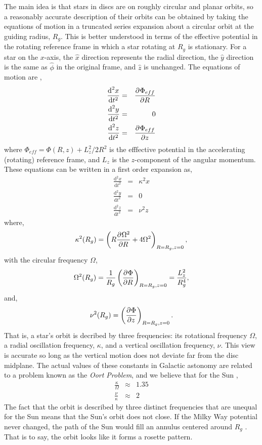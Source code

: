 The main idea is that stars in discs are on roughly circular and planar orbits, so a reasonably accurate description of their orbits can be obtained by taking the equations of motion in a truncated series expansion about a circular orbit at the guiding radius, $R_g$. This is better understood in terms of the effective potential in the rotating reference frame in which a star rotating at $R_g$ is stationary. For a star on the $x$-axis, the $\hat{x}$ direction represents the radial direction, the $\hat{y}$ direction is the same as $\hat{\phi}$ in the original frame, and $\hat{z}$ is unchanged. The equations of motion are \citep{BT},
\begin{eqnarray}
\frac{\text{d}^2x}{\text{d} t^2} &=& \frac{\partial^{} {\Phi_{eff}}}{\partial {R}^{}}\\
\frac{\text{d}^2y}{\text{d} t^2} &=& 0\\
\frac{\text{d}^2z}{\text{d} t^2} &=& \frac{\partial^{} {\Phi_{eff}}}{\partial {z}^{}}
\end{eqnarray}
where $\Phi_{eff} = \Phi(R,z) + L_z^2/2 R^2$ is the efffective potential in the accelerating (rotating) reference frame, and $L_z$ is the $z$-component of the angular momentum. These equations can be written in a first order expansion as,
\begin{eqnarray}
\frac{\text{d}^2x}{\text{d} t^2} &=& \kappa^2 x\\
\frac{\text{d}^2y}{\text{d} t^2} &=& 0\\
\frac{\text{d}^2z}{\text{d} t^2} &=& \nu^2 z
\end{eqnarray}
where,
\begin{equation}
\kappa^2(R_g) = \left(R \frac{\partial^{} {\Omega^2}}{\partial {R}^{}} + 4 \Omega^2\right)_{R=R_g,z=0},
\end{equation}
with the circular frequency $\Omega$,
\begin{equation}
\Omega^2(R_g) = \frac{1}{R_g} \left(\frac{\partial^{} {\Phi}}{\partial {R}^{}}\right)_{R=R_g,z=0} = \frac{L_z^2}{R_g^4},
\end{equation}
and,
\begin{equation}
\nu^2(R_g) = \left(\frac{\partial^{} {\Phi}}{\partial {z}^{}}\right)_{R=R_g,z=0}.
\end{equation}
That is, a star's orbit is decribed by three frequencies: its rotational frequency $\Omega$, a radial oscillation frequency, $\kappa$, and a vertical oscillation frequency, $\nu$. This view is accurate so long as the vertical motion does not deviate far from the disc midplane. The actual values of these constants in Galactic astonomy are related to a problem known as the \textit{Oort Problem}, and we believe that for the Sun \citep{BT},
\begin{eqnarray}
\frac{\kappa}{\Omega} &\approx& 1.35 \\
\frac{\nu}{\kappa} &\approx& 2
\end{eqnarray} 
The fact that the orbit is described by three distinct frequencies that are unequal for the Sun means that the Sun's orbit does not close. If the Milky Way potential never changed, the path of the Sun would fill an annulus centered around $R_g$ \citep{BT}. That is to say, the orbit looks like it forms a rosette pattern.

